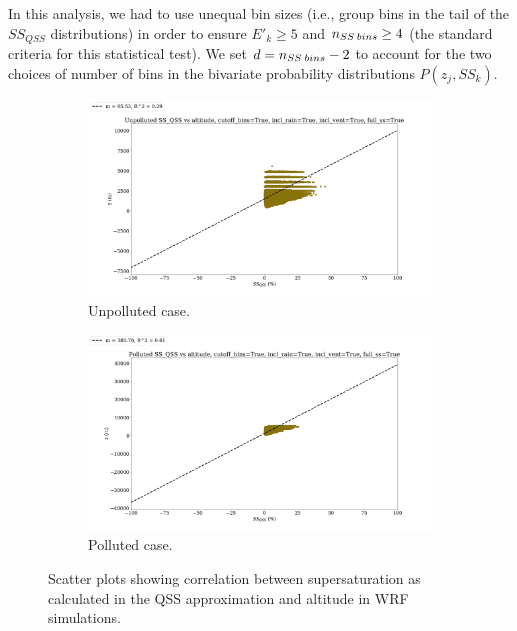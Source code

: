 \documentclass{article}
\begin{document}
In this analysis, we had to use unequal bin sizes (i.e., group bins in the tail of the $SS_{QSS}$ distributions) in order to ensure $E'_k \geq 5$ and $n_{SS\hspace{0.2em}bins} \geq 4$ (the standard criteria for this statistical test). We set $d = n_{SS\hspace{0.2em}bins} - 2$ to account for the two choices of number of bins in the bivariate probability distributions $P(z_j, SS_k)$.
\begin{figure}[ht]
	\centering
	\begin{subfigure}{0.7\textwidth}
		\includegraphics[width=\textwidth]{revmywrf/v12_ss_qss_vs_z_Unpolluted_figure.png}
		\caption{Unpolluted case.}
		\label{wrfssqssvszunpoll}
	\end{subfigure}
	\begin{subfigure}{0.7\textwidth}
		\includegraphics[width=\textwidth]{revmywrf/v12_ss_qss_vs_z_Polluted_figure.png}
		\caption{Polluted case.}
		\label{wrfssqssvszpoll}
	\end{subfigure}
	\caption{Scatter plots showing correlation between supersaturation as calculated in the QSS approximation and altitude in WRF simulations.}
	\label{wrfssqssvsz}
\end{figure}
\end{document}
